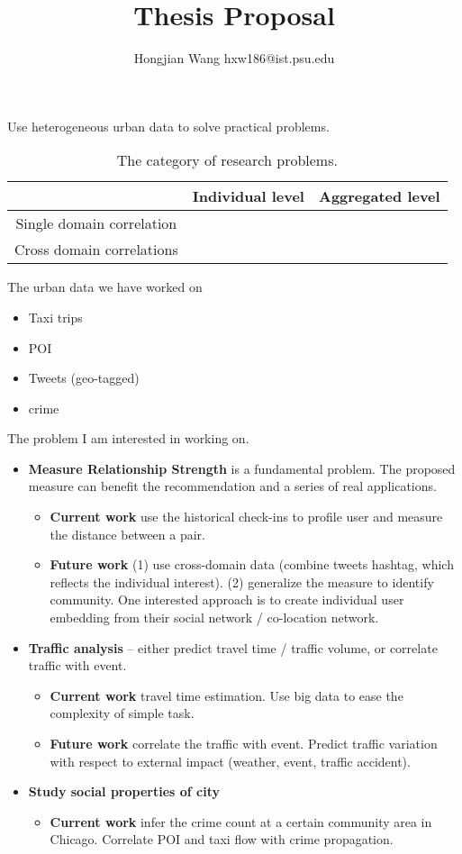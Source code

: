 \documentclass[11pt]{article}
\title{Thesis Proposal}
\author{Hongjian Wang \qquad hxw186@ist.psu.edu}
\date{}
\begin{document}
\maketitle

Use heterogeneous urban data to solve practical problems.


\begin{table}[h]
\centering
\caption{The category of research problems.}
\begin{tabular}{|c|c|c|}
\hline
 & Individual level & Aggregated level \\ \hline
Single domain correlation & 	&  \\ \hline
Cross domain correlations &     &  \\ \hline
\end{tabular}
\end{table}


The urban data we have worked on
\begin{itemize}
\item Taxi trips
\item POI
\item Tweets (geo-tagged)
\item crime
\end{itemize}

The problem I am interested in working on.
\begin{itemize}
\item \textbf{Measure Relationship Strength} is a fundamental problem. The proposed measure can benefit the recommendation and a series of real applications. 
	\begin{itemize}
		\item \textbf{Current work} use the historical check-ins to profile user and measure the distance between a pair. 
        \item \textbf{Future work} (1) use cross-domain data (combine tweets hashtag, which reflects the individual interest). (2) generalize the measure to identify community. One interested approach is to create individual user embedding from their social network / co-location network. 
	\end{itemize}
\item \textbf{Traffic analysis} -- either predict travel time / traffic volume, or correlate traffic with event. 
	\begin{itemize}
		\item \textbf{Current work} travel time estimation. Use big data to ease the complexity of simple task.
        \item \textbf{Future work} correlate the traffic with event. Predict traffic variation with respect to external impact (weather, event, traffic accident).
	\end{itemize}
\item \textbf{Study social properties of city}
	\begin{itemize}
		\item \textbf{Current work} infer the crime count at a certain community area in Chicago. Correlate POI and taxi flow with crime propagation.
	\end{itemize}
\end{itemize}
\end{document}
